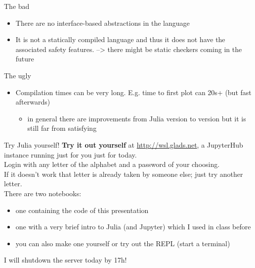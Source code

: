 \documentclass[compress,presentation,aspectratio=169]{beamer}
\begin{document}



\begin{frame}[label={sec:org87110ce}]{The bad}
  \footnotesize
\begin{itemize}
\item There are no interface-based abstractions in the language
\item It is not a statically compiled language and thus it does not have
the associated safety features.
--> there might be static checkers coming in the future
\end{itemize}
\end{frame}

\begin{frame}[label={sec:orgd4030d7}]{The ugly}
  \footnotesize
\begin{itemize}
\item Compilation times can be very long.  E.g. time to first plot can
20s+ (but fast afterwards)
\begin{itemize}
\item in general there are improvements from Julia version to version
  but it is still far from satisfying
\end{itemize}
\end{itemize}
\end{frame}

\begin{frame}{Try Julia yourself!}
  \footnotesize
\textbf{Try it out yourself} at \url{http://wsl.glads.net}, a JupyterHub
instance running just for you just for today.\\

Login with any letter of the alphabet and a password of your
choosing.\\
If it doesn't work that letter is already taken by someone else; just try another
letter.\\[3mm]

\pause
There are two notebooks:
\begin{itemize}
\item one containing the code of this presentation
\item one with a very brief intro to Julia (and Jupyter) which I
    used in class before
\item you can also make one yourself or try out the REPL (start a terminal)
\end{itemize}

\pause
  I will shutdown the server today by 17h!
\end{frame}
\end{document}
